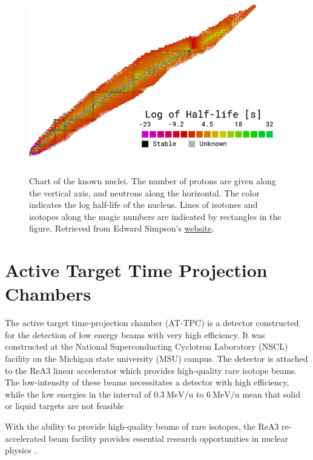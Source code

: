 \begin{figure}
\centering
\includegraphics[width=\textwidth, height=8cm]{../plots/chart}
\caption[Chart of the nuclei]{Chart of the known nuclei. The number of protons are given along the vertical axis, and neutrons along the horizontal. The color indicates the log half-life of the nucleus. Lines of isotones and isotopes along the magic numbers are indicated by rectangles in the figure. Retrieved from Edward Simpson's \href{https://people.physics.anu.edu.au/~ecs103/chart/}{website}.}
\end{figure}

\section{Active Target Time Projection Chambers}\label{sec:attpc}

The active target time-projection chamber (AT-TPC) is a detector constructed for the detection of low energy beams with very high efficiency. It was constructed at the National Superconducting Cyclotron Laboratory (NSCL) facility on the Michigan state university (MSU) campus. The detector is attached to the ReA3 linear accelerator which provides high-quality rare isotope beams. The low-intensity of these beams necessitates a detector with high efficiency, while the low energies in the interval of $\SI[per-mode=symbol]{0.3}{\MeV \per \atomicmassunit}$ to $\SI[per-mode=symbol]{6}{\MeV \per \atomicmassunit}$ mean that solid or liquid targets are not feasible \cite{Bradt2017a}

 With the ability to provide high-quality beams of rare isotopes, the ReA3 re-accelerated beam facility provides essential research opportunities in nuclear physics \cite{Kester2010}. 

